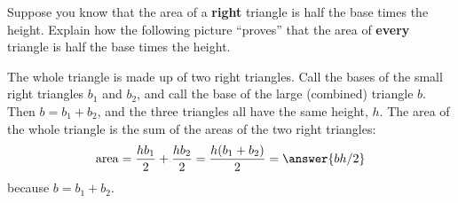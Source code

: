 \documentclass[nooutcomes]{ximera}
\begin{document}
\begin{problem}
Suppose you know that the area of a \textbf{right} triangle is
  half the base times the height. Explain how the following picture
  ``proves'' that the area of \textbf{every} triangle is half the base times the
  height.

\begin{freeResponse}
\begin{hint}
The whole triangle is made up of two right triangles.  Call the bases of the small right triangles $b_1$ and $b_2$, and call the base of the large (combined) triangle $b$.  Then $b=b_1+b_2$, and the three triangles all have the same height, $h$.   The area of the whole triangle is the sum of the areas of the two right triangles:  
\[
\mathrm{area} =  \frac{hb_1}{2}+ \frac{hb_2}{2}= \frac{h(b_1 + b_2)}{2} = \answer{bh/2}
\]
because $b=b_1+b_2$.
\end{hint}
\end{freeResponse}
\end{problem}
\end{document}
